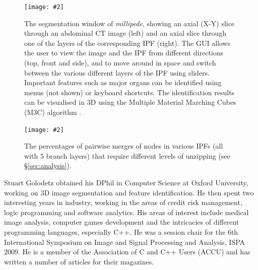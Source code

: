 \documentclass[10pt,twocolumn,twoside]{IEEEtran}
\newcommand{\stufigexx}[5]				%
{
	\begin{figure}[#5]
	\begin{center}
		\texttt{[image: \#2]}
		\caption{#3}
		\label{#4}
	\end{center}
	\end{figure}
}
\begin{document}
\clearpage

\stufigexx{width=.9\linewidth}{millipede.png}{The segmentation window of \emph{millipede}, showing an axial (X-Y) slice through an abdominal CT image (left) and an axial slice through one of the layers of the corresponding IPF (right). The GUI allows the user to view the image and the IPF from different directions (top, front and side), and to move around in space and switch between the various different layers of the IPF using sliders. Important features such as major organs can be identified using menus (not shown) or keyboard shortcuts. The identification results can be visualised in 3D using the Multiple Material Marching Cubes (M3C) algorithm \cite{wu03}.}{fig:millipede}{p}

\stufigexx{width=.8\linewidth}{pairwisenodemerges.png}{The percentages of pairwise merges of nodes in various IPFs (all with $5$ branch layers) that require different levels of unzipping (see \S\ref{sec:analysis}).}{fig:pairwisenodemerges}{p}

\clearpage




\vspace{1cm}

\begin{IEEEbiography}{Stuart Golodetz}
obtained his DPhil in Computer Science at Oxford University, working on 3D image segmentation and feature identification. He then spent two interesting years in industry, working in the areas of credit risk management, logic programming and software analytics. His areas of interest include medical image analysis, computer games development and the intricacies of different programming languages, especially C++. He was a session chair for the 6th International Symposium on Image and Signal Processing and Analysis, ISPA 2009. He is a member of the Association of C and C++ Users (ACCU) and has written a number of articles for their magazines.
\end{IEEEbiography}
\end{document}
